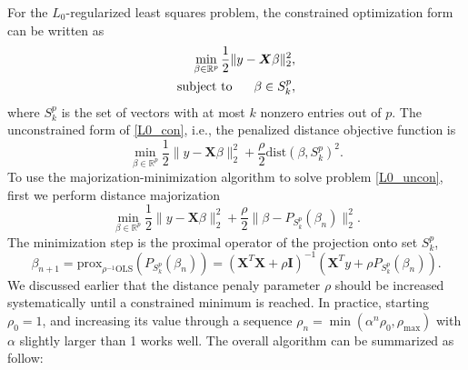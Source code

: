 For the $L_0$-regularized least squares problem, the constrained optimization form can be written as 
\begin{equation} \label{L0_con}
    \begin{aligned}
    \min_{\beta\in \mathbb{R}^p} \frac{1}{2}\|y-\bm{X}\beta\|_2^2, \\
    \text{subject to} \hspace{0.6cm} \beta \in S_k^p,
    \end{aligned}
\end{equation}
where $S_k^p$ is the set of vectors with at most $k$ nonzero entries out of $p$. The unconstrained form of \eqref{L0_con}, i.e., the penalized distance objective function is
\begin{equation} \label{L0_uncon}
    \min_{\beta\in \mathbb{R}^p} \frac{1}{2}\|y-\bm{X}\beta\|_2^2+\frac{\rho}{2}\text{dist}(\beta, S_k^p)^2.
\end{equation}
To use the majorization-minimization algorithm to solve problem \eqref{L0_uncon}, first we perform distance majorization
\begin{equation}
    \min_{\beta\in \mathbb{R}^p} \frac{1}{2}\|y-\bm{X}\beta\|_2^2+\frac{\rho}{2}\|\beta-P_{S_k^p}(\beta_n)\|_2^2.
\end{equation}
The minimization step is the proximal operator of the projection onto set $S_k^p$,
\begin{equation}
    \beta_{n+1}=\text{prox}_{\rho^{-1}\text{OLS}}(P_{S_k^p}(\beta_n))=(\bm{X}^T\bm{X}+\rho\bm{I})^{-1}(\bm{X}^Ty+\rho P_{S_k^p}(\beta_n)).
\end{equation}
We discussed earlier that the distance penaly parameter $\rho$ should be increased systematically until a constrained minimum is reached. In practice, starting $\rho_0=1$, and increasing its value through a sequence $\rho_n=\min(\alpha^n\rho_0, \rho_{\max})$ with  $\alpha$ slightly larger than 1 works well. The overall algorithm can be summarized as follow:
